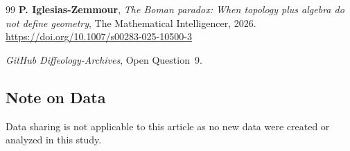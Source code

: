 \documentclass[10pt,letterpaper,reqno]{amsart}
\begin{document}
\begin{thebibliography}{99}
    \textbf{P. Iglesias-Zemmour},
    \textit{The Boman paradox: When topology plus algebra do not define geometry},
    The Mathematical Intelligencer, 2026.\\
    \url{https://doi.org/10.1007/s00283-025-10500-3}
    
    \bysame %
    \textit{GitHub Diffeology-Archives},
    Open Question~9.
    
  \end{thebibliography}
  
  
  \subsection*{Note on Data}
  
  Data sharing is not applicable to this article as no new data were created or analyzed in this study.
  
  
\end{document}
